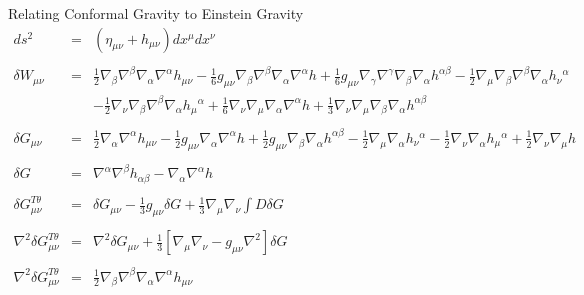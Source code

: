 \documentclass[8pt,aspectratio=1610]{beamer}
\begin{document}

\begin{frame}{Relating Conformal Gravity to Einstein Gravity}
	\begin{eqnarray}
	ds^2 &=& (\eta_{\mu\nu} + h_{\mu\nu})dx^\mu dx^\nu
	\nonumber\\ \nonumber\\
	\delta W_{\mu\nu}&=&\tfrac{1}{2} \nabla_{\beta}\nabla^{\beta}\nabla_{\alpha}\nabla^{\alpha}h_{\mu \nu}
	-  \tfrac{1}{6} g_{\mu \nu} \nabla_{\beta}\nabla^{\beta}\nabla_{\alpha}\nabla^{\alpha}h
	+ \tfrac{1}{6} g_{\mu \nu} \nabla_{\gamma}\nabla^{\gamma}\nabla_{\beta}\nabla_{\alpha}h^{\alpha \beta}
	-  \tfrac{1}{2} \nabla_{\mu}\nabla_{\beta}\nabla^{\beta}\nabla_{\alpha}h_{\nu}{}^{\alpha}
	\nonumber\\
	&& -  \tfrac{1}{2} \nabla_{\nu}\nabla_{\beta}\nabla^{\beta}\nabla_{\alpha}h_{\mu}{}^{\alpha}
	+ \tfrac{1}{6} \nabla_{\nu}\nabla_{\mu}\nabla_{\alpha}\nabla^{\alpha}h
	+ \tfrac{1}{3} \nabla_{\nu}\nabla_{\mu}\nabla_{\beta}\nabla_{\alpha}h^{\alpha \beta}
	\nonumber\\\nonumber\\
	\delta G_{\mu\nu}&=&\tfrac{1}{2} \nabla_{\alpha}\nabla^{\alpha}h_{\mu \nu}
	-  \tfrac{1}{2} g_{\mu \nu} \nabla_{\alpha}\nabla^{\alpha}h
	+ \tfrac{1}{2} g_{\mu \nu} \nabla_{\beta}\nabla_{\alpha}h^{\alpha \beta}
	-  \tfrac{1}{2} \nabla_{\mu}\nabla_{\alpha}h_{\nu}{}^{\alpha}
	-  \tfrac{1}{2} \nabla_{\nu}\nabla_{\alpha}h_{\mu}{}^{\alpha}
	+ \tfrac{1}{2} \nabla_{\nu}\nabla_{\mu}h
	\nonumber\\\nonumber\\
	\delta G &=&  \nabla^\alpha \nabla^\beta h_{\alpha\beta} - \nabla_\alpha\nabla^\alpha h
	\nonumber\\\nonumber\\
	\delta G^{T\theta}_{\mu\nu} &=& \delta G_{\mu\nu} - \frac{1}{3}g_{\mu\nu}\delta G + \frac{1}{3}\nabla_\mu\nabla_\nu \int D \delta G
	\nonumber\\ \nonumber\\
	\nabla^2\delta  G^{T\theta}_{\mu\nu} &=& \nabla^2 \delta G_{\mu\nu} + \frac{1}{3}\left[ 
	\nabla_\mu\nabla_\nu - g_{\mu\nu}\nabla^2\right]\delta G
	\nonumber\\ \nonumber\\
	\nabla^2 \delta G_{\mu\nu}^{T\theta} 
	&=& \tfrac{1}{2} \nabla_{\beta}\nabla^{\beta}\nabla_{\alpha}\nabla^{\alpha}h_{\mu \nu}

\end{eqnarray}
\end{frame}
\end{document}
